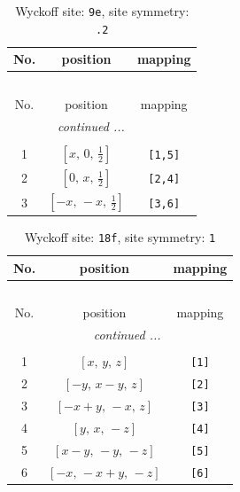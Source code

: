 \documentclass[fleqn,8pt]{jsarticle}
\begin{document}
\begin{longtable}{ccc}
\caption{Wyckoff site: {\tt 9e}, site symmetry: {\tt .2}}
 \\
 \hline \hline
No. & position & mapping \\ \hline \endfirsthead

\multicolumn{2}{l}{\tablename\ \thetable{}} \\
 \hline \hline
No. & position & mapping \\ \hline \endhead

 \hline \hline
\multicolumn{2}{r}{\footnotesize\it continued ...} \\ \endfoot

 \hline \hline
\multicolumn{2}{r}{} \\ \endlastfoot

1 & $\left[ x,\, 0,\, \frac{1}{2} \right]$ & {\tt [1,5]} \\ \hline
2 & $\left[ 0,\, x,\, \frac{1}{2} \right]$ & {\tt [2,4]} \\ \hline
3 & $\left[ - x,\, - x,\, \frac{1}{2} \right]$ & {\tt [3,6]} \\
\end{longtable}
\renewcommand{\arraystretch}{1.2}
\begin{longtable}{ccc}
\caption{Wyckoff site: {\tt 18f}, site symmetry: {\tt 1}}
 \\
 \hline \hline
No. & position & mapping \\ \hline \endfirsthead

\multicolumn{2}{l}{\tablename\ \thetable{}} \\
 \hline \hline
No. & position & mapping \\ \hline \endhead

 \hline \hline
\multicolumn{2}{r}{\footnotesize\it continued ...} \\ \endfoot

 \hline \hline
\multicolumn{2}{r}{} \\ \endlastfoot

1 & $\left[ x,\, y,\, z \right]$ & {\tt [1]} \\ \hline
2 & $\left[ - y,\, x - y,\, z \right]$ & {\tt [2]} \\ \hline
3 & $\left[ - x + y,\, - x,\, z \right]$ & {\tt [3]} \\ \hline
4 & $\left[ y,\, x,\, - z \right]$ & {\tt [4]} \\ \hline
5 & $\left[ x - y,\, - y,\, - z \right]$ & {\tt [5]} \\ \hline
6 & $\left[ - x,\, - x + y,\, - z \right]$ & {\tt [6]} \\
\end{longtable}
\end{document}
